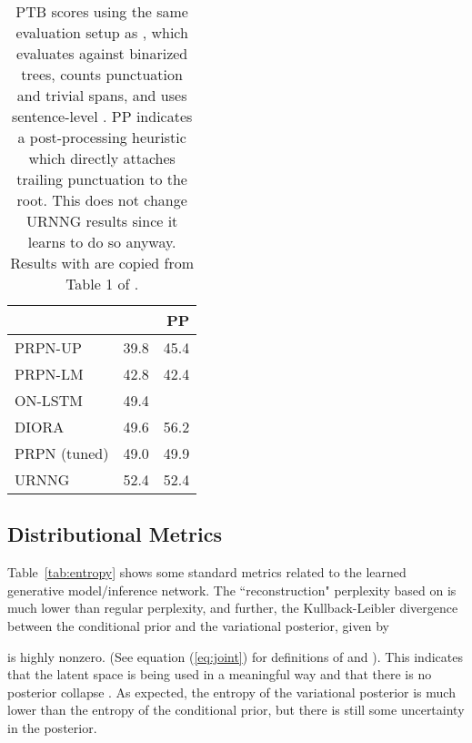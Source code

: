 \documentclass[11pt,a4paper]{article}
\begin{document}
\begin{table}[t]
    \small
    \centering
    \vspace{-3mm}
    \begin{tabular}{l r r}
    
    \toprule
    &   &  \textsc{PP} \\
    \midrule
PRPN-UP & 39.8 & 45.4 \\
PRPN-LM & 42.8 & 42.4 \\
ON-LSTM  \cite{shen2019ordered} & 49.4 &  \\
DIORA  \cite{drozdov2018latent} & 49.6 & 56.2 \\
PRPN (tuned) & 49.0 & 49.9 \\
URNNG & 52.4 & 52.4 \\
 \bottomrule
    \end{tabular}
        \vspace{-2mm}
    \caption{PTB  scores using the same evaluation setup as \citet{drozdov2018latent}, which evaluates against binarized trees, counts punctuation and trivial spans, and uses sentence-level . \textsc{PP} indicates a post-processing heuristic which directly attaches trailing punctuation to the root. This does not change URNNG results since it learns to do so anyway. Results with  are copied from Table 1 of \citet{drozdov2018latent}. }
    \label{tab:compprior}
          \vspace{-1mm}
\end{table}
\vspace{-1.5mm}
\subsection{Distributional Metrics}
\vspace{-1.5mm}
Table~\ref{tab:entropy} shows some standard metrics related to the learned
generative model/inference network. The ``reconstruction" perplexity
based on  is
much lower than regular perplexity, and further, the Kullback-Leibler divergence between the conditional prior and the variational posterior, given by

is highly nonzero. (See equation (\ref{eq:joint}) for definitions of  and ). This indicates that the latent space is being used in a meaningful way and that there
is no posterior collapse \cite{bowman2016vae}.
As expected, the entropy of the variational posterior is much lower than 
the entropy of the conditional prior, but there is still some uncertainty in the posterior.
\end{document}
